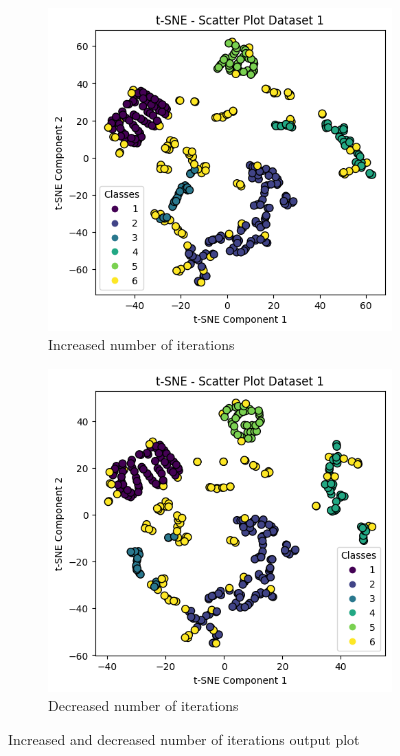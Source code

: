 \documentclass[12pt]{report}
\begin{document}
	\begin{figure}[H]
		\centering
		\begin{subfigure}{.5\textwidth}
			\centering
			\includegraphics[width=.8\linewidth]{../t-SNE/OutputPlot/Dataset1OutputPlot/Dataset1 increased nr_plots.png}
			\caption{Increased number of iterations}
			\label{Dataset1IncreasedNrIterations}
		\end{subfigure}%
		\begin{subfigure}{.5\textwidth}
			\centering
			\includegraphics[width=.8\linewidth]{../t-SNE/OutputPlot/Dataset1OutputPlot/Dataset1 decreased nr_plots.png}
			\caption{Decreased number of iterations}
			\label{Dataset1DecreasedNrIterations}
		\end{subfigure}
		\caption{Increased and decreased number of iterations output plot}
		\label{Dataset1IncreasedDecreasedNrIterations}
	\end{figure}
\end{document}
